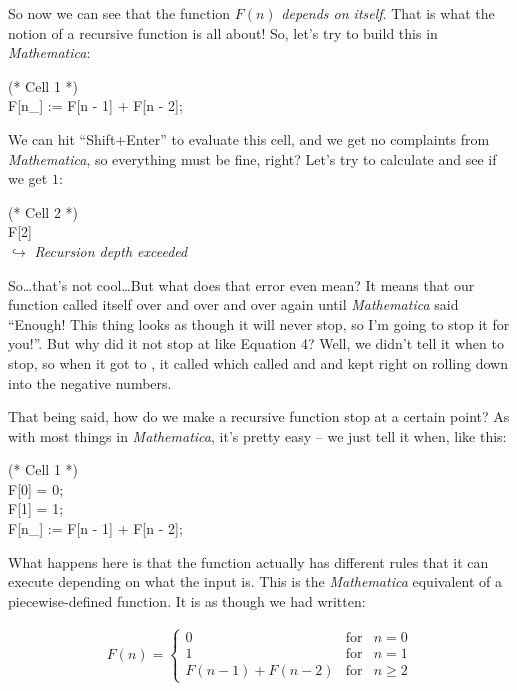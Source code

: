 So now we can see that the function $F(n)$ \emph{depends on itself}. That is what the notion of a recursive function is all about! So, let's try to build this in \emph{Mathematica}:

\begin{code}
	   (* Cell 1 *) \\
	   F[n\_] := F[n - 1] + F[n - 2];
\end{code}

We can hit ``Shift+Enter'' to evaluate this cell, and we get no complaints from \emph{Mathematica}, so everything must be fine, right? Let's try to calculate  and see if we get $1$:

\begin{code}
	   (* Cell 2 *)\\
	   F[2]\\
	   $\hookrightarrow$ \emph{Recursion depth exceeded}
\end{code}

So\ldots that's not cool\ldots But what does that error even mean? It means that our function  called itself over and over and over again until \emph{Mathematica} said ``Enough! This thing looks as though it will never stop, so I'm going to stop it for you!''. But why did it not stop at  like Equation 4? Well, we didn't tell it when to stop, so when it got to , it called  which called  and  and kept right on rolling down into the negative numbers.

That being said, how do we make a recursive function stop at a certain point? As with most things in \emph{Mathematica}, it's pretty easy -- we just tell it when, like this:

\begin{code}
	   (* Cell 1 *)\\
	   F[0] = 0;\\
	   F[1] = 1;\\
	   F[n\_] := F[n - 1] + F[n - 2];
\end{code}

What happens here is that the function  actually has different rules that it can execute depending on what the input is. This is the \emph{Mathematica} equivalent of a piecewise-defined function. It is as though we had written:

\begin{align}
	   F(n) = \left\{ \begin{array}{rcl}
			 0 & \mbox{for} & n = 0 \\
			 1 & \mbox{for} & n = 1 \\
			 F(n-1) + F(n-2) & \mbox{for} & n \geq 2
	   \end{array}\right.
\end{align}

